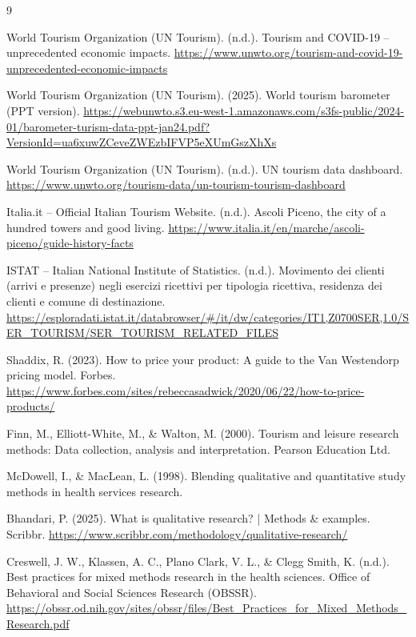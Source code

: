 \documentclass[a4paper, 12pt, twoside]{report}  %
\begin{document}
\newpage

\sloppy
\begin{thebibliography}{9}
\raggedright

World Tourism Organization (UN Tourism). (n.d.). Tourism and COVID-19 – unprecedented economic impacts. \url{https://www.unwto.org/tourism-and-covid-19-unprecedented-economic-impacts}

World Tourism Organization (UN Tourism). (2025). World tourism barometer (PPT version). \url{https://webunwto.s3.eu-west-1.amazonaws.com/s3fs-public/2024-01/barometer-turism-data-ppt-jan24.pdf?VersionId=ua6xuwZCeveZWEzbIFVP5eXUmGszXhXs}

World Tourism Organization (UN Tourism). (n.d.). UN tourism data dashboard. \url{https://www.unwto.org/tourism-data/un-tourism-tourism-dashboard}

Italia.it – Official Italian Tourism Website. (n.d.). Ascoli Piceno, the city of a hundred towers and good living. \url{https://www.italia.it/en/marche/ascoli-piceno/guide-history-facts}

ISTAT – Italian National Institute of Statistics. (n.d.). Movimento dei clienti (arrivi e presenze) negli esercizi ricettivi per tipologia ricettiva, residenza dei clienti e comune di destinazione. \url{https://esploradati.istat.it/databrowser/#/it/dw/categories/IT1,Z0700SER,1.0/SER_TOURISM/SER_TOURISM_RELATED_FILES}

Shaddix, R. (2023). How to price your product: A guide to the Van Westendorp pricing model. Forbes. \url{https://www.forbes.com/sites/rebeccasadwick/2020/06/22/how-to-price-products/}

Finn, M., Elliott-White, M., \& Walton, M. (2000). Tourism and leisure research methods: Data collection, analysis and interpretation. Pearson Education Ltd.

McDowell, I., \& MacLean, L. (1998). Blending qualitative and quantitative study methods in health services research.

Bhandari, P. (2025). What is qualitative research? | Methods \& examples. Scribbr. \url{https://www.scribbr.com/methodology/qualitative-research/}

Creswell, J. W., Klassen, A. C., Plano Clark, V. L., \& Clegg Smith, K. (n.d.). Best practices for mixed methods research in the health sciences. Office of Behavioral and Social Sciences Research (OBSSR). \url{https://obssr.od.nih.gov/sites/obssr/files/Best_Practices_for_Mixed_Methods_Research.pdf}


\end{thebibliography}
\end{document}
